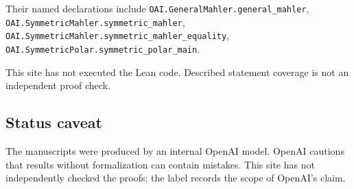 \documentclass[11pt]{article}
\begin{document}
Their named declarations include \texttt{OAI.GeneralMahler.general\_mahler}, \texttt{OAI.SymmetricMahler.symmetric\_mahler}, \texttt{OAI.SymmetricMahler.symmetric\_mahler\_equality}, \texttt{OAI.SymmetricPolar.symmetric\_polar\_main}.

This site has not executed the Lean code. Described statement coverage is not an independent proof check.

\subsection{Status caveat}
The manuscripts were produced by an internal OpenAI model. OpenAI cautions that results without formalization can contain mistakes. This site has not independently checked the proofs; the label records the scope of OpenAI's claim.
\end{document}
